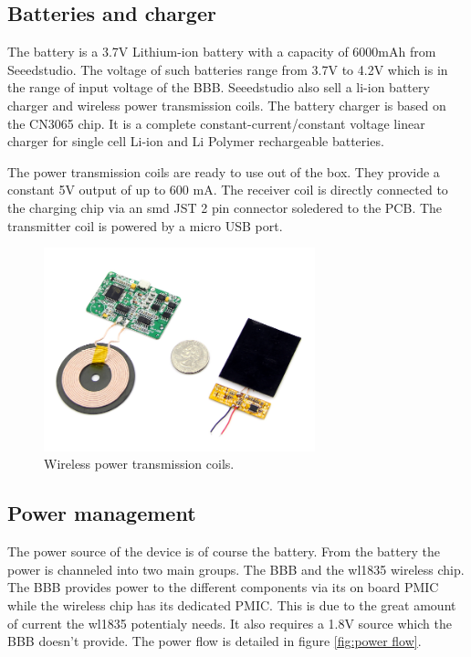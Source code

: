 \subsection{Batteries and charger}
The battery is a 3.7V Lithium-ion battery with a capacity of 6000mAh from Seeedstudio. The voltage of such batteries range from 3.7V to 4.2V which is in the range of input voltage of the BBB.
Seeedstudio also sell a li-ion battery charger and wireless power transmission coils. The battery charger is based on the CN3065 chip. It is a complete constant-current/constant voltage linear charger for single cell Li-ion and Li Polymer rechargeable batteries.

The power transmission coils are ready to use out of the box. They provide a constant 5V output of up to 600 mA.
The receiver coil is directly connected to the charging chip via an smd JST 2 pin connector soledered to the PCB. The transmitter coil is powered by a micro USB port.

\begin{figure}[!ht]
    \centering
    \includegraphics[width=0.7\textwidth,keepaspectratio]{chap/hardFig/wireless_charger}
    \caption{Wireless power transmission coils.}
    \label{fig:wireless charger}
\end{figure}


\subsection{Power management}

The power source of the device is of course the battery. From the battery the power is channeled into two main groups. The BBB and the wl1835 wireless chip. The BBB provides power to the different components via its on board PMIC while the wireless chip has its dedicated PMIC. This is due to the great amount of current the wl1835 potentialy needs. It also requires a 1.8V source which the BBB doesn't provide. The power flow is detailed in figure \ref{fig:power flow}.


